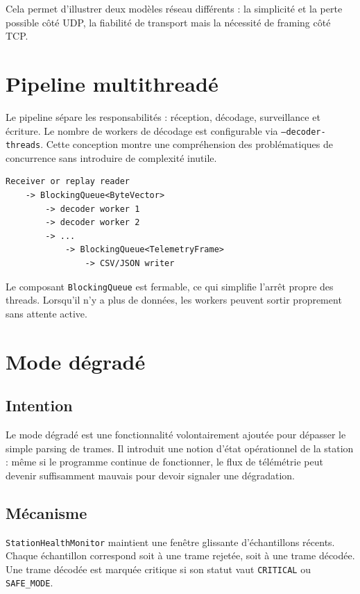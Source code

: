 \documentclass[11pt,a4paper]{article}
\newcommand{\code}[1]{\texttt{#1}}
\begin{document}
Cela permet d'illustrer deux modèles réseau différents : la simplicité et la perte possible côté UDP, la fiabilité de transport mais la nécessité de framing côté TCP.

\section{Pipeline multithreadé}

Le pipeline sépare les responsabilités : réception, décodage, surveillance et écriture. Le nombre de workers de décodage est configurable via \code{--decoder-threads}. Cette conception montre une compréhension des problématiques de concurrence sans introduire de complexité inutile.

\begin{lstlisting}
Receiver or replay reader
    -> BlockingQueue<ByteVector>
        -> decoder worker 1
        -> decoder worker 2
        -> ...
            -> BlockingQueue<TelemetryFrame>
                -> CSV/JSON writer
\end{lstlisting}

Le composant \code{BlockingQueue} est fermable, ce qui simplifie l'arrêt propre des threads. Lorsqu'il n'y a plus de données, les workers peuvent sortir proprement sans attente active.

\section{Mode dégradé}

\subsection{Intention}

Le mode dégradé est une fonctionnalité volontairement ajoutée pour dépasser le simple parsing de trames. Il introduit une notion d'état opérationnel de la station : même si le programme continue de fonctionner, le flux de télémétrie peut devenir suffisamment mauvais pour devoir signaler une dégradation.

\subsection{Mécanisme}

\code{StationHealthMonitor} maintient une fenêtre glissante d'échantillons récents. Chaque échantillon correspond soit à une trame rejetée, soit à une trame décodée. Une trame décodée est marquée critique si son statut vaut \code{CRITICAL} ou \code{SAFE\_MODE}.
\end{document}
